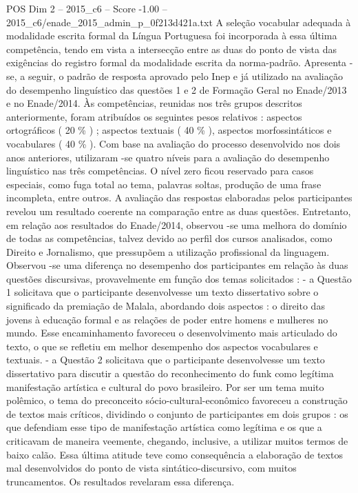 \begin{textsample}{POS Dim 2 – 2015\_c6 – Score -1.00 – 2015\_c6/enade\_2015\_admin\_p\_0f213d421a.txt}
A seleção vocabular adequada à modalidade escrita formal da Língua Portuguesa foi incorporada à essa última competência, tendo em vista a intersecção entre as duas do ponto de vista das exigências do registro formal da modalidade escrita da norma-padrão.
Apresenta -se, a seguir, o padrão de resposta aprovado pelo Inep e já utilizado na avaliação do desempenho linguístico das questões 1 e 2 de Formação Geral no Enade/2013 e no Enade/2014.
Às competências, reunidas nos três grupos descritos anteriormente, foram atribuídos os seguintes pesos relativos : aspectos ortográficos ( 20 \% ) ; aspectos textuais ( 40 \% ), aspectos morfossintáticos e vocabulares ( 40 \% ).
Com base na avaliação do processo desenvolvido nos dois anos anteriores, utilizaram -se quatro níveis para a avaliação do desempenho linguístico nas três competências.
O nível zero ficou reservado para casos especiais, como fuga total ao tema, palavras soltas, produção de uma frase incompleta, entre outros.
A avaliação das respostas elaboradas pelos participantes revelou um resultado coerente na comparação entre as duas questões.
Entretanto, em relação aos resultados do Enade/2014, observou -se uma melhora do domínio de todas as competências, talvez devido ao perfil dos cursos analisados, como Direito e Jornalismo, que pressupõem a utilização profissional da linguagem.
Observou -se uma diferença no desempenho dos participantes em relação às duas questões discursivas, provavelmente em função dos temas solicitados : - a Questão 1 solicitava que o participante desenvolvesse um texto dissertativo sobre o significado da premiação de Malala, abordando dois aspectos : o direito das jovens à educação formal e as relações de poder entre homens e mulheres no mundo.
Esse encaminhamento favoreceu o desenvolvimento mais articulado do texto, o que se refletiu em melhor desempenho dos aspectos vocabulares e textuais. - a Questão 2 solicitava que o participante desenvolvesse um texto dissertativo para discutir a questão do reconhecimento do funk como legítima manifestação artística e cultural do povo brasileiro.
Por ser um tema muito polêmico, o tema do preconceito sócio-cultural-econômico favoreceu a construção de textos mais críticos, dividindo o conjunto de participantes em dois grupos : os que defendiam esse tipo de manifestação artística como legítima e os que a criticavam de maneira veemente, chegando, inclusive, a utilizar muitos termos de baixo calão.
Essa última atitude teve como consequência a elaboração de textos mal desenvolvidos do ponto de vista sintático-discursivo, com muitos truncamentos.
Os resultados revelaram essa diferença.

\end{textsample}
